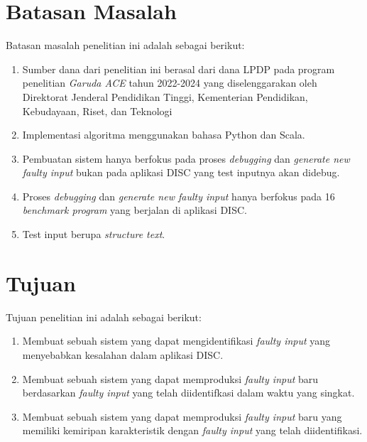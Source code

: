 \section{Batasan Masalah}
\label{sec:batasanmasalah}

Batasan masalah penelitian ini adalah sebagai berikut:

\begin{enumerate}[nolistsep]

  \item Sumber dana dari penelitian ini berasal dari dana LPDP pada program penelitian \emph{Garuda ACE} tahun 2022-2024 yang diselenggarakan oleh Direktorat Jenderal Pendidikan Tinggi,
  Kementerian Pendidikan, Kebudayaan, Riset, dan Teknologi
  
  \item Implementasi algoritma menggunakan bahasa Python dan Scala.

  \item Pembuatan sistem hanya berfokus pada proses \emph{debugging} dan \emph{generate new faulty input} bukan pada aplikasi DISC yang test inputnya akan didebug.

  \item Proses \emph{debugging} dan \emph{generate new faulty input} hanya berfokus pada 16 \emph{benchmark program} yang berjalan di aplikasi DISC. 

  \item Test input berupa \emph{structure text}.

\end{enumerate}

\section{Tujuan}
\label{sec:Tujuan}

Tujuan penelitian ini adalah sebagai berikut:

\begin{enumerate}[nolistsep]

  \item Membuat sebuah sistem yang dapat mengidentifikasi \emph{faulty input} yang menyebabkan kesalahan dalam aplikasi DISC.
  \item Membuat sebuah sistem yang dapat memproduksi \emph{faulty input} baru berdasarkan \emph{faulty input} yang telah diidentifkasi dalam waktu yang singkat.
  \item Membuat sebuah sistem yang dapat memproduksi \emph{faulty input} baru yang memiliki kemiripan karakteristik dengan \emph{faulty input} yang telah diidentifikasi.

\end{enumerate}

